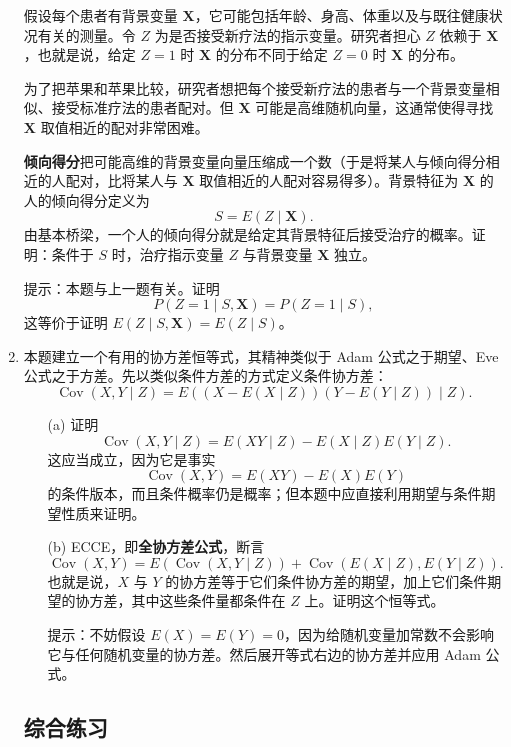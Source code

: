\documentclass[UTF8,12pt,a4paper,fontset=fandol]{ctexart}
\begin{document}
\begin{enumerate}
  假设每个患者有背景变量 $\mathbf X$，它可能包括年龄、身高、体重以及与既往健康状况有关的测量。令 $Z$ 为是否接受新疗法的指示变量。研究者担心 $Z$ 依赖于 $\mathbf X$，也就是说，给定 $Z=1$ 时 $\mathbf X$ 的分布不同于给定 $Z=0$ 时 $\mathbf X$ 的分布。

  为了把苹果和苹果比较，研究者想把每个接受新疗法的患者与一个背景变量相似、接受标准疗法的患者配对。但 $\mathbf X$ 可能是高维随机向量，这通常使得寻找 $\mathbf X$ 取值相近的配对非常困难。

  \textbf{倾向得分}把可能高维的背景变量向量压缩成一个数（于是将某人与倾向得分相近的人配对，比将某人与 $\mathbf X$ 取值相近的人配对容易得多）。背景特征为 $\mathbf X$ 的人的倾向得分定义为
  \[
    S=E(Z\mid \mathbf X).
  \]
  由基本桥梁，一个人的倾向得分就是给定其背景特征后接受治疗的概率。证明：条件于 $S$ 时，治疗指示变量 $Z$ 与背景变量 $\mathbf X$ 独立。

  \noindent 提示：本题与上一题有关。证明
  \[
    P(Z=1\mid S,\mathbf X)=P(Z=1\mid S),
  \]
  这等价于证明 $E(Z\mid S,\mathbf X)=E(Z\mid S)$。

  \item 本题建立一个有用的协方差恒等式，其精神类似于 Adam 公式之于期望、Eve 公式之于方差。先以类似条件方差的方式定义条件协方差：
  \[
    \operatorname{Cov}(X,Y\mid Z)
    =E((X-E(X\mid Z))(Y-E(Y\mid Z))\mid Z).
  \]
  \begin{enumerate}
    \item[(a)] 证明
    \[
      \operatorname{Cov}(X,Y\mid Z)
      =E(XY\mid Z)-E(X\mid Z)E(Y\mid Z).
    \]
    这应当成立，因为它是事实
    \[
      \operatorname{Cov}(X,Y)=E(XY)-E(X)E(Y)
    \]
    的条件版本，而且条件概率仍是概率；但本题中应直接利用期望与条件期望性质来证明。

    \item[(b)] ECCE，即\textbf{全协方差公式}，断言
    \[
      \operatorname{Cov}(X,Y)
      =E(\operatorname{Cov}(X,Y\mid Z))
      +\operatorname{Cov}(E(X\mid Z),E(Y\mid Z)).
    \]
    也就是说，$X$ 与 $Y$ 的协方差等于它们条件协方差的期望，加上它们条件期望的协方差，其中这些条件量都条件在 $Z$ 上。证明这个恒等式。

    \noindent 提示：不妨假设 $E(X)=E(Y)=0$，因为给随机变量加常数不会影响它与任何随机变量的协方差。然后展开等式右边的协方差并应用 Adam 公式。
  \end{enumerate}

\subsection*{综合练习}


\end{enumerate}
\end{document}

